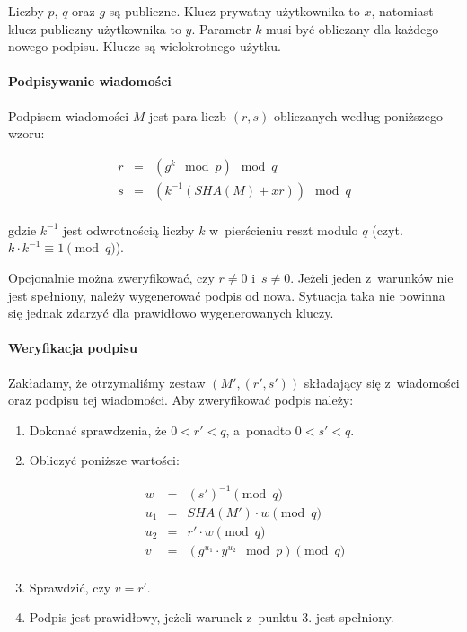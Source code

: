 \documentclass{article}
\begin{document}
        Liczby $p$, $q$ oraz $g$ są publiczne. Klucz prywatny użytkownika to $x$, natomiast klucz publiczny użytkownika to $y$. Parametr $k$ musi być obliczany dla każdego nowego podpisu. Klucze są wielokrotnego użytku.
        
        \paragraph*{Podpisywanie wiadomości} Podpisem wiadomości $M$ jest para liczb $(r, s)$ obliczanych według poniższego wzoru:
        
        \begin{equation*}
            \begin{array}{lcl}
                r & = & (g^{k} \mod p) \mod q \\
                s & = & (k^{-1} (SHA(M) + xr)) \mod q \\
            \end{array}
        \end{equation*}
        
        \noindent gdzie $k^{-1}$ jest odwrotnością liczby $k$ w~pierścieniu reszt modulo $q$ (czyt. $k \cdot k^{-1} \equiv 1 \pmod q$). 
        
        Opcjonalnie można zweryfikować, czy $r \neq 0$ i~$s \neq 0$. Jeżeli jeden z~warunków nie jest spełniony, należy wygenerować podpis od nowa. Sytuacja taka nie powinna się jednak zdarzyć dla prawidłowo wygenerowanych kluczy.
        
        \paragraph*{Weryfikacja podpisu} Zakładamy, że otrzymaliśmy zestaw $(M', (r', s'))$ składający się z~wiadomości oraz podpisu tej wiadomości. Aby zweryfikować podpis należy:
        
        \begin{enumerate}
            \item Dokonać sprawdzenia, że $0 < r' < q$, a~ponadto $0 < s' < q$.
            \item Obliczyć poniższe wartości:
            
                \begin{equation*}
                    \begin{array}{lcl}
                        w & = & (s')^{-1} \pmod q \\
                        u_{1} & = & SHA(M') \cdot w \pmod q \\
                        u_{2} & = & r' \cdot w \pmod q \\
                        v & = & (g^{u_{1}} \cdot y^{u_{2}} \mod p) \pmod q \\
                    \end{array}
                \end{equation*}
            \item Sprawdzić, czy $v = r'$.
            \item Podpis jest prawidłowy, jeżeli warunek z~punktu 3. jest spełniony.
        \end{enumerate}
\end{document}
